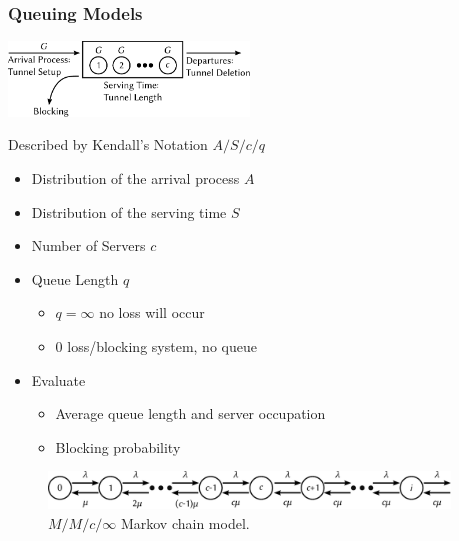 \documentclass{beamer}
\begin{document}
\begin{frame}
	\frametitle{Queuing Models}
	\begin{center}
		\includegraphics[height=2cm]{../../chapters/04-mobilenets/images/GGn-model.pdf}
	\end{center}

	Described by Kendall's Notation $A/S/c/q$
	\begin{itemize}
	\item Distribution of the arrival process $A$
	\item Distribution of the serving time $S$
	\item Number of Servers $c$
	\item Queue Length $q$
	\begin{itemize}
		\item $q=\infty$ no loss will occur
		\item $0$ loss/blocking system, no queue
	\end{itemize}
	\item Evaluate
		\begin{itemize}
			\item Average queue length and server occupation
			\item Blocking probability
		\end{itemize}
	\end{itemize}
\end{frame}

\begin{frame}
	\begin{figure}
		\includegraphics[height=1cm]{../../chapters/04-mobilenets/images/markovchain.pdf}
		\caption{$M/M/c/\infty$ Markov chain model.}
	\end{figure}
\end{frame}
\end{document}
